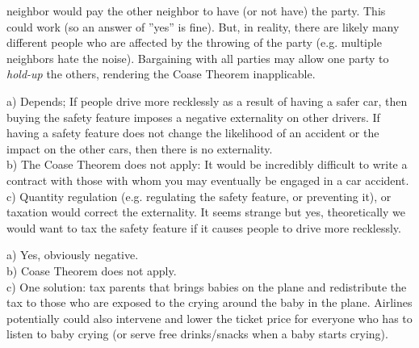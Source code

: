 {{		neighbor would pay the other neighbor to have (or not have) the party. This could work (so an
		answer of ”yes” is fine). But, in reality, there are likely many different people who are affected by
		the throwing of the party (e.g. multiple neighbors hate the noise). Bargaining with all parties may
		allow one party to \textit{hold-up} the others, rendering the Coase Theorem inapplicable.
		\item a) Depends; If people drive more recklessly as a result of having a safer car, then buying the safety
		feature imposes a negative externality on other drivers. If having a safety feature does not change
		the likelihood of an accident or the impact on the other cars, then there is no externality.\\
		b) The Coase Theorem does not apply: It would be incredibly difficult to write a contract with
		those with whom you may eventually be engaged in a car accident.\\
		c) Quantity regulation (e.g. regulating the safety feature, or preventing it), or taxation would
		correct the externality. It seems strange but yes, theoretically we would want to tax the safety
		feature if it causes people to drive more recklessly.
		\item a) Yes, obviously negative.\\
		b) Coase Theorem does not apply.\\
		c) One solution: tax parents that brings babies on the plane and redistribute the tax to those who
		are exposed to the crying around the baby in the plane. Airlines potentially could also intervene
		and lower the ticket price for everyone who has to listen to baby crying (or serve free drinks/snacks
		when a baby starts crying).
}}

\pbn
{}

